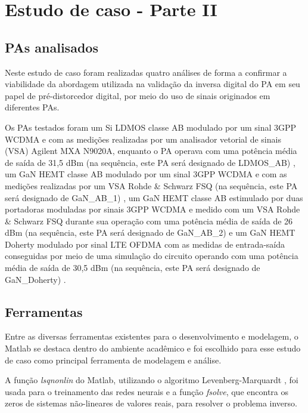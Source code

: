 \chapter{Estudo de caso - Parte II} \label{cha:estudoii}

\section{PAs analisados} \label{sec:estudoii-pas}

Neste estudo de caso foram realizadas quatro análises de forma a confirmar a viabilidade da abordagem utilizada na validação da inversa digital do PA em seu papel de pré-distorcedor digital, por meio do uso de sinais originados em diferentes PAs.

Os PAs testados foram um Si LDMOS classe AB modulado por um sinal 3GPP WCDMA e com as medições realizadas por um analisador vetorial de sinais (VSA) Agilent MXA N9020A, enquanto o PA operava com uma potência média de saída de 31,5 dBm (na sequência, este PA será designado de LDMOS{\_}AB) {\cite{franca_three-layer_2015}}, um GaN HEMT classe AB modulado por um sinal 3GPP WCDMA e com as medições realizadas por um VSA Rohde \& Schwarz FSQ (na sequência, este PA será designado de GaN{\_}AB{\_}1) {\cite{Bonfim2016}}, um GaN HEMT classe AB estimulado por duas portadoras moduladas por sinais 3GPP WCDMA e medido com um VSA Rohde \& Schwarz FSQ durante sua operação com uma potência média de saída de 26 dBm (na sequência, este PA será designado de GaN{\_}AB{\_}2) {\cite{franca_three-layer_2015}} e um GaN HEMT Doherty modulado por sinal LTE OFDMA com as medidas de entrada-saída conseguidas por meio de uma simulação do circuito operando com uma potência média de saída de 30,5 dBm (na sequência, este PA será designado de GaN{\_}Doherty) {\cite{franca_three-layer_2015}}.

\section{Ferramentas} \label{sec:estudoii-fer}

Entre as diversas ferramentas existentes para o desenvolvimento e modelagem, o Matlab se destaca dentro do ambiente acadêmico e foi escolhido para esse estudo de caso como principal ferramenta de modelagem e análise.

A função \textit{lsqnonlin} do Matlab, utilizando o algoritmo Levenberg-Marquardt \cite{Marquardt1963}, foi usada para o treinamento das redes neurais e a função \textit{fsolve}, que encontra os zeros de sistemas não-lineares de valores reais, para resolver o problema inverso.

